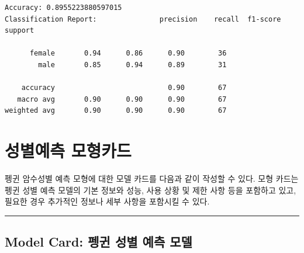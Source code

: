 \documentclass[
  letterpaper,
  chapter,a4paper,showtrims,openright,hidelinks]{oblivoir}
\begin{document}
\begin{verbatim}
Accuracy: 0.8955223880597015
Classification Report:               precision    recall  f1-score   support

      female       0.94      0.86      0.90        36
        male       0.85      0.94      0.89        31

    accuracy                           0.90        67
   macro avg       0.90      0.90      0.90        67
weighted avg       0.90      0.90      0.90        67
\end{verbatim}

\hypertarget{uxc131uxbcc4uxc608uxce21-uxbaa8uxd615uxce74uxb4dc}{%
\section{성별예측
모형카드}\label{uxc131uxbcc4uxc608uxce21-uxbaa8uxd615uxce74uxb4dc}}

펭귄 암수성별 예측 모형에 대한 모델 카드를 다음과 같이 작성할 수 있다.
모형 카드는 펭귄 성별 예측 모델의 기본 정보와 성능, 사용 상황 및 제한
사항 등을 포함하고 있고, 필요한 경우 추가적인 정보나 세부 사항을
포함시킬 수 있다.

\begin{center}\rule{0.5\linewidth}{0.5pt}\end{center}

\hypertarget{model-card-uxd3aduxadc4-uxc131uxbcc4-uxc608uxce21-uxbaa8uxb378}{%
\subsection{Model Card: 펭귄 성별 예측
모델}\label{model-card-uxd3aduxadc4-uxc131uxbcc4-uxc608uxce21-uxbaa8uxb378}}
\end{document}

